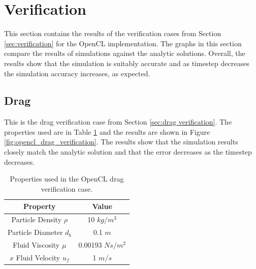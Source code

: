 \documentclass[a4paper,11pt,titlepage]{report}
\begin{document}
\section{Verification}
\label{sec:OpenCL verification}
This section contains the results of the verification cases from Section \ref{sec:verification} for the OpenCL implementation. The graphs in this section compare the results of simulations against the analytic solutions. Overall, the results show that the simulation is suitably accurate and as timestep decreases the simulation accuracy increases, as expected.
\subsection{Drag}
This is the drag verification case from Section \ref{sec:drag verification}. The properties used are in Table \ref{tab:opencl drag properties} and the results are shown in Figure \ref{fig:opencl_drag_verification}. The results show that the simulation results closely match the analytic solution and that the error decreases as the timestep decreases.
\begin{table}[!htb]
\centering
\begin{tabular}{| c c |}
\hline
Property & Value\\
\hline
Particle Density $\rho$ & 10 $kg/m^3$ \\
Particle Diameter $d_b$ & 0.1 $m$ \\
Fluid Viscosity $\mu$ & 0.00193 $Ns/m^2$ \\
$x$ Fluid Velocity $u_f$ & 1 $m/s$ \\
\hline
\end{tabular}
\caption{Properties used in the OpenCL drag verification case.}
\label{tab:opencl drag properties}
\end{table}
\end{document}
